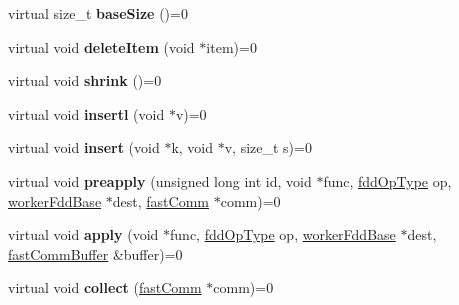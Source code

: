 \begin{DoxyCompactItemize}
\hypertarget{classfaster_1_1workerFddBase_adf7e8dd9728b866d37bc32aeba4e7c3c}{}\label{classfaster_1_1workerFddBase_adf7e8dd9728b866d37bc32aeba4e7c3c} 
virtual size\+\_\+t {\bfseries base\+Size} ()=0
\item 
\hypertarget{classfaster_1_1workerFddBase_aac667e68629f17c9c5cd30bf9701f03c}{}\label{classfaster_1_1workerFddBase_aac667e68629f17c9c5cd30bf9701f03c} 
virtual void {\bfseries delete\+Item} (void $\ast$item)=0
\item 
\hypertarget{classfaster_1_1workerFddBase_afd958be3b502d6147e3145c4d2926452}{}\label{classfaster_1_1workerFddBase_afd958be3b502d6147e3145c4d2926452} 
virtual void {\bfseries shrink} ()=0
\item 
\hypertarget{classfaster_1_1workerFddBase_a7e2a919ffa1ecd117c2d487957f9e431}{}\label{classfaster_1_1workerFddBase_a7e2a919ffa1ecd117c2d487957f9e431} 
virtual void {\bfseries insertl} (void $\ast$v)=0
\item 
\hypertarget{classfaster_1_1workerFddBase_adef4d0ad067b5bc9ca39d21260b46818}{}\label{classfaster_1_1workerFddBase_adef4d0ad067b5bc9ca39d21260b46818} 
virtual void {\bfseries insert} (void $\ast$k, void $\ast$v, size\+\_\+t s)=0
\item 
\hypertarget{classfaster_1_1workerFddBase_a6dbb190837ac0eecf4c2a4b4c3f95920}{}\label{classfaster_1_1workerFddBase_a6dbb190837ac0eecf4c2a4b4c3f95920} 
virtual void {\bfseries preapply} (unsigned long int id, void $\ast$func, \hyperlink{namespacefaster_a64379512d12d41c6e58f176939abfd80}{fdd\+Op\+Type} op, \hyperlink{classfaster_1_1workerFddBase}{worker\+Fdd\+Base} $\ast$dest, \hyperlink{classfaster_1_1fastComm}{fast\+Comm} $\ast$comm)=0
\item 
\hypertarget{classfaster_1_1workerFddBase_a875b78e89873f4b4b88611f8e1127baa}{}\label{classfaster_1_1workerFddBase_a875b78e89873f4b4b88611f8e1127baa} 
virtual void {\bfseries apply} (void $\ast$func, \hyperlink{namespacefaster_a64379512d12d41c6e58f176939abfd80}{fdd\+Op\+Type} op, \hyperlink{classfaster_1_1workerFddBase}{worker\+Fdd\+Base} $\ast$dest, \hyperlink{classfaster_1_1fastCommBuffer}{fast\+Comm\+Buffer} \&buffer)=0
\item 
\hypertarget{classfaster_1_1workerFddBase_ab9f9ea54f3480513b53e40760399e569}{}\label{classfaster_1_1workerFddBase_ab9f9ea54f3480513b53e40760399e569} 
virtual void {\bfseries collect} (\hyperlink{classfaster_1_1fastComm}{fast\+Comm} $\ast$comm)=0
\item 
\hypertarget{classfaster_1_1workerFddBase_ab64fee29f072dfc7a28c7c2cdee55f4f}{}\label{classfaster_1_1workerFddBase_ab64fee29f072dfc7a28c7c2cdee55f4f} 

\end{DoxyCompactItemize}
